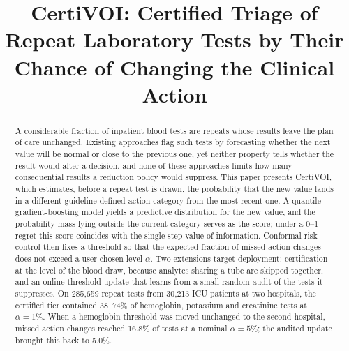 \documentclass[conference]{IEEEtran}
\begin{document}
\title{CertiVOI: Certified Triage of Repeat Laboratory Tests by Their Chance of Changing the Clinical Action}

\author{
\and
{}
}

\maketitle

\begin{abstract}
A considerable fraction of inpatient blood tests are repeats whose results leave the plan of care unchanged. Existing approaches flag such tests by forecasting whether the next value will be normal or close to the previous one, yet neither property tells whether the result would alter a decision, and none of these approaches limits how many consequential results a reduction policy would suppress. This paper presents CertiVOI, which estimates, before a repeat test is drawn, the probability that the new value lands in a different guideline-defined action category from the most recent one. A quantile gradient-boosting model yields a predictive distribution for the new value, and the probability mass lying outside the current category serves as the score; under a 0--1 regret this score coincides with the single-step value of information. Conformal risk control then fixes a threshold so that the expected fraction of missed action changes does not exceed a user-chosen level $\alpha$. Two extensions target deployment: certification at the level of the blood draw, because analytes sharing a tube are skipped together, and an online threshold update that learns from a small random audit of the tests it suppresses. On 285,659 repeat tests from 30,213 ICU patients at two hospitals, the certified tier contained 38--74\% of hemoglobin, potassium and creatinine tests at $\alpha=1\%$. When a hemoglobin threshold was moved unchanged to the second hospital, missed action changes reached 16.8\% of tests at a nominal $\alpha=5\%$; the audited update brought this back to 5.0\%.
\end{abstract}
\end{document}
